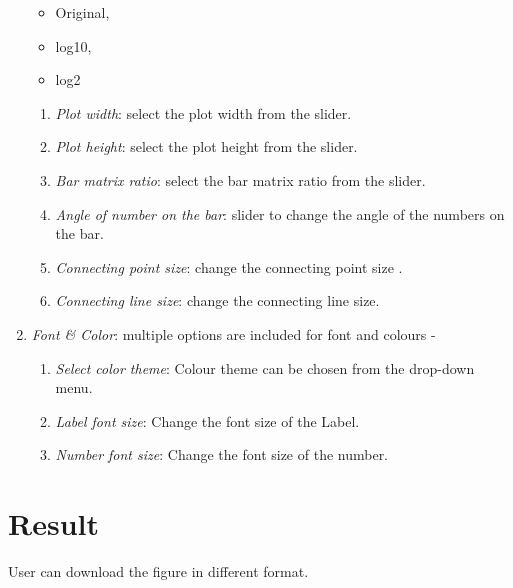 \documentclass[
  a4paper,
  oneside,
  open=any]{scrreport}
\providecommand{\tightlist}{%
  \setlength{\itemsep}{0pt}\setlength{\parskip}{0pt}}\usepackage{longtable,booktabs,array}
\begin{document}
\begin{enumerate}
  \begin{itemize}
  \tightlist
  \item
    Original,
  \item
    log10,
  \item
    log2
  \end{itemize}

  \begin{enumerate}
  \def\labelenumii{\roman{enumii}.}
  \setcounter{enumii}{6}
  \item
    \emph{Plot width}: select the plot width from the slider.
  \item
    \emph{Plot height}: select the plot height from the slider.
  \item
    \emph{Bar matrix ratio}: select the bar matrix ratio from the
    slider.
  \item
    \emph{Angle of number on the bar}: slider to change the angle of the
    numbers on the bar.
  \item
    \emph{Connecting point size}: change the connecting point size .
  \item
    \emph{Connecting line size}: change the connecting line size.
  \end{enumerate}
\item
  \emph{Font \& Color}: multiple options are included for font and
  colours -

  \begin{enumerate}
  \def\labelenumii{\roman{enumii}.}
  \item
    \emph{Select color theme}: Colour theme can be chosen from the
    drop-down menu.
  \item
    \emph{Label font size}: Change the font size of the Label.
  \item
    \emph{Number font size}: Change the font size of the number.
  \end{enumerate}
\end{enumerate}

\hypertarget{result}{%
\section{Result}\label{result}}

User can download the figure in different format.
\end{document}
